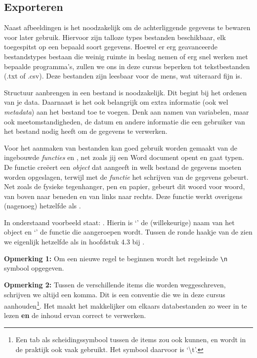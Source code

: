 \documentclass[a4paper,11pt, fleqn]{article}
\begin{document}
\iffalse
\subsection{Exporteren}

Naast afbeeldingen is het noodzakelijk om de achterliggende gegevens te bewaren voor later gebruik. Hiervoor zijn talloze types bestanden beschikbaar, elk toegespitst op een bepaald soort gegevens. Hoewel er erg geavanceerde bestandstypes bestaan die weinig ruimte in beslag nemen of erg snel werken met bepaalde programma's, zullen we ons in deze cursus beperken tot tekstbestanden (.txt of .csv). Deze bestanden zijn leesbaar voor de mens, wat uiteraard fijn is.

Structuur aanbrengen in een bestand is noodzakelijk. Dit begint bij het ordenen van je data. Daarnaast is het ook belangrijk om extra informatie (ook wel \textit{metadata}) aan het bestand toe te voegen. Denk aan namen van variabelen, maar ook meetomstandigheden, de datum en andere informatie die een gebruiker van het bestand nodig heeft om de gegevens te verwerken.

Voor het aanmaken van bestanden kan goed gebruik worden gemaakt van de ingebouwde \textit{functies}  en , net zoals jij een Word document opent en gaat typen. De functie  cre\"eert een \textit{object} dat aangeeft in welk bestand de gegevens moeten worden opgeslagen, terwijl met de \textit{functie}  het schrijven van de gegevens gebeurt. Net zoals de fysieke tegenhanger, pen en papier, gebeurt dit woord voor woord, van boven naar beneden en van links naar rechts. Deze functie  werkt overigens (nagenoeg) hetzelfde als .

In onderstaand voorbeeld staat: . 
Hierin is `' de (willekeurige) naam van het object en `' de functie die aangeroepen wordt. Tussen de ronde haakje van de  zien we eigenlijk hetzelfde als in hoofdstuk 4.3 bij .


{\bf Opmerking 1:} Om een nieuwe regel te beginnen wordt het regeleinde \verb,\n, symbool opgegeven.

{\bf Opmerking 2:} Tussen de verschillende items die worden weggeschreven, schrijven we altijd een komma. Dit is een conventie die we in deze cursus aanhouden\footnote{Een tab als scheidingssymbool tussen de items zou ook kunnen, en wordt in de praktijk ook vaak gebruikt. Het symbool daarvoor is `\textbackslash t'.}.
Het maakt het makkelijker om elkaars databestanden zo weer in te lezen {\bf en} de inhoud ervan correct te verwerken. 
\end{document}
